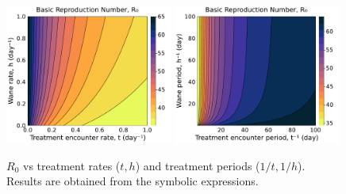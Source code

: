 \documentclass{article}
\begin{document}
\begin{figure}[H]
    \centering
    \includegraphics[width=0.49\textwidth]{../../fig/brn_txh_heatmap_s.pdf}
    \includegraphics[width=0.49\textwidth]{../../fig/brn_txh_heatmap_rev_s.pdf}
    \caption{\(R_0\) vs treatment rates (\(t,h\)) and treatment periods (\(1/t,1/h\)). Results are obtained from the symbolic expressions.}
\end{figure}
\end{document}
